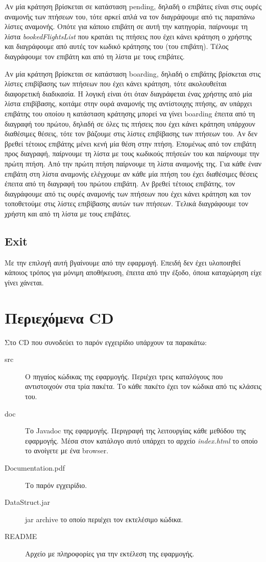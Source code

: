 \documentclass[a4paper]{article}
\begin{document}
Αν μία κράτηση βρίσκεται σε κατάσταση pending, δηλαδή ο επιβάτες είναι στις
ουρές αναμονής των πτήσεων του, τότε αρκεί απλά να τον διαγράψουμε από τις
παραπάνω λίστες αναμονής. Οπότε για κάποιο επιβάτη σε αυτή την κατηγορία,
παίρνουμε τη λίστα \emph{bookedFlightsList} που κρατάει τις πτήσεις που έχει
κάνει κράτηση ο χρήστης και διαγράφουμε από αυτές τον κωδικό κράτησης του (του
επιβάτη). Τέλος διαγράφουμε τον επιβάτη και από τη λίστα με τους επιβάτες.

Αν μία κράτηση βρίσκεται σε κατάσταση boarding, δηλαδή ο επιβάτης βρίσκεται στις
λίστες επιβίβασης των πτήσεων που έχει κάνει κράτηση, τότε ακολουθείται
διαφορετική διαδικασία. Η λογική είναι ότι όταν διαγράφεται ένας χρήστης από μία
λίστα επιβίβασης, κοιτάμε στην ουρά αναμονής της αντίστοιχης πτήσης, αν υπάρχει
επιβάτης του οποίου η κατάσταση κράτησης μπορεί να γίνει boarding έπειτα από τη
διαγραφή του πρώτου, δηλαδή σε όλες τις πτήσεις που έχει κάνει κράτηση υπάρχουν
διαθέσιμες θέσεις, τότε τον βάζουμε στις λίστες επιβίβασης των πτήσεων του. Αν
δεν βρεθεί τέτοιος επιβάτης μένει κενή μία θέση στην πτήση. Επομένως από τον
επιβάτη προς διαγραφή, παίρνουμε τη λίστα με τους κωδικούς πτήσεών του και
παίρνουμε την πρώτη πτήση. Από την πρώτη πτήση παίρνουμε τη λίστα αναμονής της.
Για κάθε έναν επιβάτη στη λίστα αναμονής ελέγχουμε αν κάθε μία πτήση του έχει
διαθέσιμες θέσεις έπειτα από τη διαγραφή του πρώτου επιβάτη. Αν βρεθεί τέτοιος
επιβάτης, τον διαγράφουμε από τις ουρές αναμονής των πτήσεων που έχει κάνει
κράτηση και τον τοποθετούμε στις λίστες επιβίβασης αυτών των πτήσεων. Τελικά
διαγράφουμε τον χρήστη και από τη λίστα με τους επιβάτες.
\subsection{Exit}
Με την επιλογή αυτή βγαίνουμε από την εφαρμογή. Επειδή δεν έχει υλοποιηθεί
κάποιος τρόπος για μόνιμη αποθήκευση, έπειτα από την έξοδο, όποια καταχώρηση
είχε γίνει χάνεται.
\section{Περιεχόμενα CD}
Στο CD που συνοδεύει το παρόν εγχειρίδιο υπάρχουν τα παρακάτω:
\begin{description}
\item[src] Ο πηγαίος κώδικας της εφαρμογής. Περιέχει τρεις καταλόγους που
αντιστοιχούν στα τρία πακέτα. Το κάθε πακέτο έχει τον κώδικα από τις κλάσεις
του.
\item[doc] Το Javadoc της εφαρμογής. Περιγραφή της λειτουργίας κάθε μεθόδου της
εφαρμογής. Μέσα στον κατάλογο αυτό υπάρχει το αρχείο \emph{index.html} το οποίο
το ανοίγετε με ένα browser.
\item[Documentation.pdf] Το παρόν εγχειρίδιο.
\item[DataStruct.jar] jar archive το οποίο περιέχει τον εκτελέσιμο κώδικα.
\item[README] Αρχείο με πληροφορίες για την εκτέλεση της εφαρμογής.
\end{description}
\end{document}
